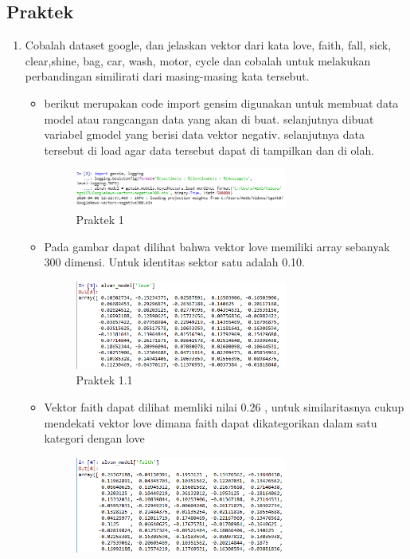 \subsection{Praktek}
\begin{enumerate}
	\item Cobalah dataset google, dan jelaskan vektor dari kata love, faith, fall, sick, clear,shine, bag, car, wash, motor, cycle dan cobalah untuk melakukan perbandingan similirati dari masing-masing kata tersebut.
	\begin{itemize}
		\item berikut merupakan code import gensim digunakan untuk membuat data model atau rangcangan data yang akan di buat. selanjutnya dibuat variabel gmodel yang berisi data vektor negativ. selanjutnya data tersebut di load agar data tersebut dapat di tampilkan dan di olah.
		\hfill\break
		
		\begin{figure}[H]
			\includegraphics[width=7cm]{figures/1174077/5/p1.png}
			\centering
			\caption{Praktek 1}
		\end{figure}
		\item Pada gambar dapat dilihat bahwa vektor love memiliki array sebanyak 300 dimensi. Untuk identitas sektor satu adalah 0.10.
		\hfill\break
		
		\begin{figure}[H]
			\includegraphics[width=7cm]{figures/1174077/5/p2.png}
			\centering
			\caption{Praktek 1.1}
		\end{figure}
		\item Vektor faith dapat dilihat memliki nilai 0.26 , untuk similaritasnya cukup mendekati vektor love dimana faith dapat dikategorikan dalam satu kategori dengan love
		\hfill\break
		
		\begin{figure}[H]
			\includegraphics[width=7cm]{figures/1174077/5/p3.png}

\end{figure}
\end{itemize}
\end{enumerate}
